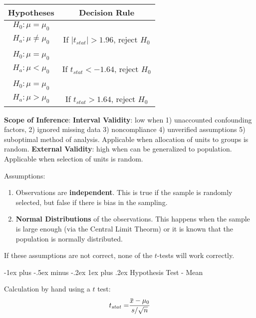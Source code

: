 \documentclass[10pt,landscape]{article}
\makeatletter
\renewcommand{\subsubsection}{\@startsection{subsubsection}{3}{0mm}%
                                {-1ex plus -.5ex minus -.2ex}%
                                {1ex plus .2ex}%
                                {\normalfont\small\bfseries}}
\newcommand{\overbar}[1]{\mkern 1.5mu\overline{\mkern-1.5mu#1\mkern-1.5mu}\mkern 1.5mu}
\makeatother
\begin{document}
\begin{multicols*}{3}
\begin{tabular}{ c  c }
Hypotheses & Decision Rule \\
\hline
$H_0 : \mu = \mu_0$ \\      $H_a : \mu \neq \mu_0$ & If $|t_{stat}| > 1.96$, reject $H_0$ \\
 & \\
$H_0 : \mu = \mu_0$ \\ $H_a : \mu < \mu_0$      & If $t_{stat} < -1.64$, reject $H_0$ \\
 & \\
$H_0 : \mu = \mu_0$ \\ $H_a : \mu > \mu_0$      & If $t_{stat} > 1.64$, reject $H_0$ \\
\end{tabular}

\textbf{Scope of Inference}: \textbf{Interval Validity}: low when 1) unaccounted confounding factors, 2) ignored missing data 3) noncompliance 4) unverified assumptions
5) suboptimal method of analysis. Applicable when allocation of units to groups is random.
 \textbf{External Validity}: high when can be generalized to population. Applicable when selection of units is random.

Assumptions:
\begin{enumerate}
\item Observations are \textbf{independent}. This is true if the sample is randomly selected, but false if there is bias in the sampling.
\item \textbf{Normal Distributions} of the observations. This happens when the sample is large enough (via the Central Limit Theorm) or it is known that the population is normally distributed.
\end{enumerate}

If these assumptions are not correct, none of the $t$-tests will work correctly.


\subsubsection{Hypothesis Test - Mean}

Calculation by hand using a $t$ test:
\begin{align*}
t_{stat} =& \frac{ \overbar{x} - \mu_0  } { s / \sqrt{n}  } \\
\end{align*}


\end{multicols*}
\end{document}
